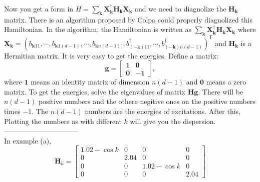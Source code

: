 \documentclass[letter]{article}
\begin{document}
Now you get a form in $H=\sum_{\bm{k}}\mathbf{X}^{\dagger}_{\bm{k}}\mathbf{H}_{\bm{k}}\mathbf{X}_{\bm{k}}$ and we need to diagnolize the $\mathbf{H}_{\bm{k}}$ matrix. There is an algorithm proposed by Colpa could properly diagnolized this Hamiltonian. In the algorithm, the Hamiltonian is written as $\sum_{\bm{k}}\mathbf{X}^{\dagger}_{\bm{k}}\mathbf{H}_{\bm{k}}\mathbf{X}_{\bm{k}}$ where $\mathbf{X}_{\bm{k}}=\left(b_{\bm{k}11},\cdots,b_{\bm{k}1(d-1)},\cdots,b_{\bm{k}n(d-1))},b_{(-\bm{k})11}^{\dagger},\cdots,b_{(-\bm{k})n(d-1)}^{\dagger}\right)^{\mathsf{T}}$ and $\mathbf{H}_{\bm{k}}$ is a Hermitian matrix. It is very easy to get the energies. Define a matrix:$$
\mathbf{g}=\begin{bmatrix}
    \mathbf{1} & \mathbf{0}  \\
    \mathbf{0} &  -\mathbf{1}
    \end{bmatrix},
$$
where $\mathbf{1}$ means an identity matrix of dimension $n(d-1)$ and $\mathbf{0}$ means a zero matrix. To get the energies, solve the eigenvalues of matrix $\mathbf{H}\mathbf{g}$. There will be $n(d-1)$ positive numbers and the othere negitive ones on the positive numbers times $-1$. The $n(d-1)$ numbers are the energies of excitations. After this, Plotting the numbers as with different $k$ will give you the dispersion. \\
--------------------------------\\
In example (a), $$
\mathbf{H}_{k}=\begin{bmatrix}
    1.02-\cos k & 0 & 0 & 0 \\
    0 &  2.04 & 0 &0 \\
    0 &  0 & 1.02-\cos k &0\\
    0 & 0 & 0& 2.04
\end{bmatrix}$$
\end{document}
